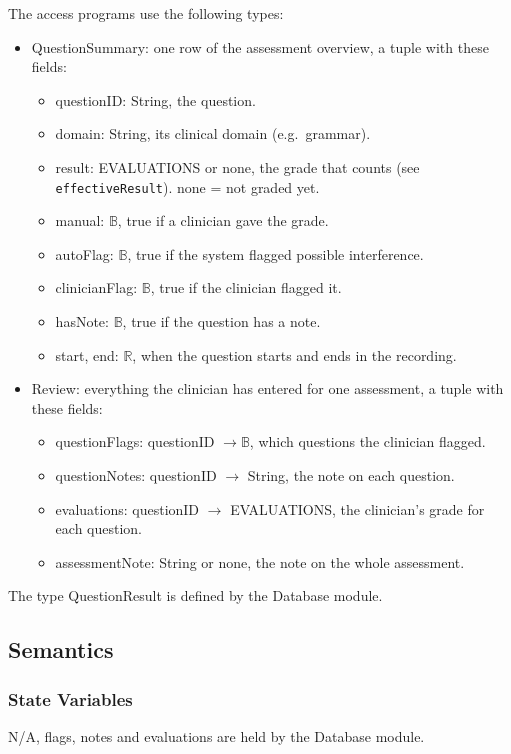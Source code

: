 \documentclass[12pt, titlepage]{article}
\begin{document}
\noindent The access programs use the following types:
\begin{itemize}
\item QuestionSummary: one row of the assessment overview, a tuple with these fields:
  \begin{itemize}
  \item questionID: String, the question.
  \item domain: String, its clinical domain (e.g.\ grammar).
  \item result: EVALUATIONS or none, the grade that counts (see \texttt{effectiveResult}). none = not graded yet.
  \item manual: $\mathbb{B}$, true if a clinician gave the grade.
  \item autoFlag: $\mathbb{B}$, true if the system flagged possible interference.
  \item clinicianFlag: $\mathbb{B}$, true if the clinician flagged it.
  \item hasNote: $\mathbb{B}$, true if the question has a note.
  \item start, end: $\mathbb{R}$, when the question starts and ends in the recording.
  \end{itemize}
\item Review: everything the clinician has entered for one assessment, a tuple with these fields:
  \begin{itemize}
  \item questionFlags: questionID $\rightarrow \mathbb{B}$, which questions the clinician flagged.
  \item questionNotes: questionID $\rightarrow$ String, the note on each question.
  \item evaluations: questionID $\rightarrow$ EVALUATIONS, the clinician's grade for each question.
  \item assessmentNote: String or none, the note on the whole assessment.
  \end{itemize}
\end{itemize}
The type QuestionResult is defined by the Database module.

\subsection{Semantics}

\subsubsection{State Variables}
N/A, flags, notes and evaluations are held by the Database module.
\end{document}
